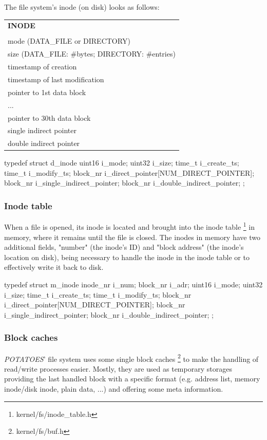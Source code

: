 \documentclass[11pt,a4paper]{scrartcl}
\begin{document}
The file system's inode (on disk) looks as follows:

\vspace{0.3cm}
\begin{tabular}{|l|}
\hline
\textbf{INODE}\\\\\hline
mode (DATA\_FILE or DIRECTORY)\\\hline
size (DATA\_FILE: \#bytes; DIRECTORY: \#entries)\\\hline
timestamp of creation\\\hline
timestamp of last modification\\\hline
pointer to 1st data block\\
...\\
pointer to 30th data block\\\hline
single indirect pointer\\\hline
double indirect pointer\\\hline
\end{tabular}

\begin{code}
typedef struct d_inode {
		uint16 i_mode;
		uint32 i_size;
		time_t i_create_ts;
		time_t i_modify_ts;
		block_nr i_direct_pointer[NUM_DIRECT_POINTER];
		block_nr i_single_indirect_pointer;
		block_nr i_double_indirect_pointer;
};
\end{code}

\subsubsection{Inode table}
\hypertarget{inodetable}{}
When a file is opened, its inode is located and brought into the inode table \footnote{kernel/fs/inode\_table.h} in memory, where it remains until the file is closed. The inodes in memory have two additional fields, "number" (the inode's ID) and "block address" (the inode's location on disk), being necessary to handle the inode in the inode table or to effectively write it back to disk.

\begin{code}
typedef struct m_inode {
		inode_nr i_num;
		block_nr i_adr;
		uint16 i_mode;
		uint32 i_size;
		time_t i_create_ts;
		time_t i_modify_ts;
		block_nr i_direct_pointer[NUM_DIRECT_POINTER];
		block_nr i_single_indirect_pointer;
		block_nr i_double_indirect_pointer;
};
\end{code}

\subsubsection{Block caches}
\hypertarget{blockcaches}{}
\textit{POTATOES}' file system uses some single block caches \footnote{kernel/fs/buf.h} to make the handling of read/write processes easier. Mostly, they are used as temporary storages providing the last handled block with a specific format (e.g. address list, memory inode/disk inode, plain data, ...) and offering some meta information.
\end{document}
